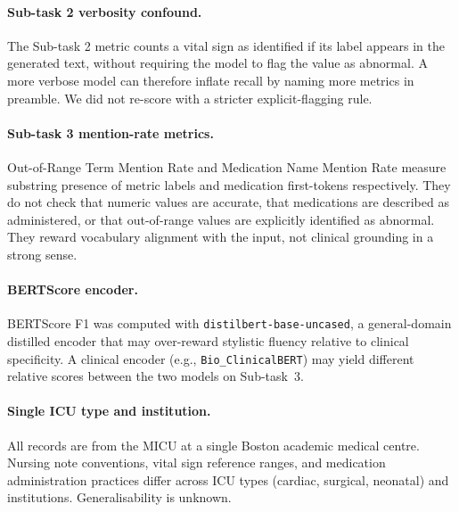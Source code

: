 \documentclass[sigconf,anonymous=false,review=false]{acmart}
\begin{document}
\paragraph{Sub-task 2 verbosity confound.}
The Sub-task 2 metric counts a vital sign as identified if its label appears
in the generated text, without requiring the model to flag the value as
abnormal. A more verbose model can therefore inflate recall by naming more
metrics in preamble. We did not re-score with a stricter explicit-flagging
rule.

\paragraph{Sub-task 3 mention-rate metrics.}
Out-of-Range Term Mention Rate and Medication Name Mention Rate measure
substring presence of metric labels and medication first-tokens
respectively. They do not check that numeric values are accurate, that
medications are described as administered, or that out-of-range values are
explicitly identified as abnormal. They reward vocabulary alignment with
the input, not clinical grounding in a strong sense.

\paragraph{BERTScore encoder.}
BERTScore F1 was computed with \texttt{distilbert-base-uncased}, a
general-domain distilled encoder that may over-reward stylistic fluency
relative to clinical specificity. A clinical encoder
(e.g., \texttt{Bio\_ClinicalBERT}) may yield different relative scores
between the two models on Sub-task~3.

\paragraph{Single ICU type and institution.}
All records are from the MICU at a single Boston academic medical centre.
Nursing note conventions, vital sign reference ranges, and medication
administration practices differ across ICU types (cardiac, surgical,
neonatal) and institutions. Generalisability is unknown.
\end{document}
